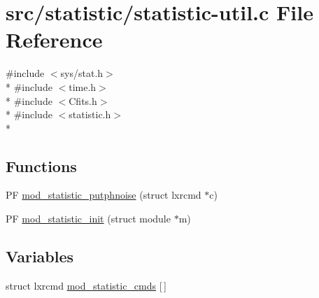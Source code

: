 \hypertarget{src_2statistic_2statistic-util_8c}{\section{src/statistic/statistic-\/util.c File Reference}
\label{src_2statistic_2statistic-util_8c}
}
{\ttfamily \#include $<$sys/stat.\+h$>$}\\*
{\ttfamily \#include $<$time.\+h$>$}\\*
{\ttfamily \#include $<$Cfits.\+h$>$}\\*
{\ttfamily \#include $<$statistic.\+h$>$}\\*
\subsection*{Functions}
\begin{DoxyCompactItemize}
\item 
P\+F \hyperlink{src_2statistic_2statistic-util_8c_adf68f86d319ba00ac620d3468420f5d4}{mod\+\_\+statistic\+\_\+putphnoise} (struct lxrcmd $\ast$c)
\item 
P\+F \hyperlink{src_2statistic_2statistic-util_8c_aedea1c5063287d3e0ce501bf630a3b05}{mod\+\_\+statistic\+\_\+init} (struct module $\ast$m)
\end{DoxyCompactItemize}
\subsection*{Variables}
\begin{DoxyCompactItemize}
\item 
struct lxrcmd \hyperlink{src_2statistic_2statistic-util_8c_a0adc435a6dca61c948182a0d8d2c9dc4}{mod\+\_\+statistic\+\_\+cmds} \mbox{[}$\,$\mbox{]}
\end{DoxyCompactItemize}


